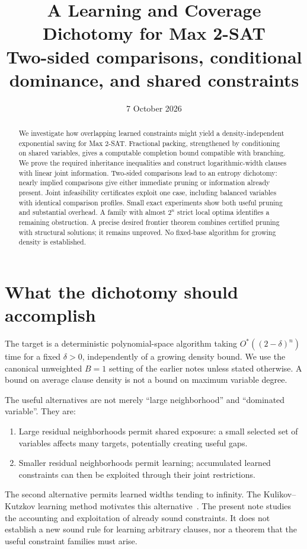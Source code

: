 \documentclass[11pt,a4paper]{article}
\title{A Learning and Coverage Dichotomy for Max 2-SAT\\
\large Two-sided comparisons, conditional dominance, and shared constraints}
\author{}
\date{7 October 2026}
\theoremstyle{definition}
\theoremstyle{remark}
\newcommand{\Ostar}{O^{*}}
\begin{document}
\maketitle

\begin{abstract}
We investigate how overlapping learned constraints might yield a
density-independent exponential saving for Max 2-SAT. Fractional packing,
strengthened by conditioning on shared variables, gives a computable
completion bound compatible with branching. We prove the required
inheritance inequalities and construct logarithmic-width clauses with
linear joint information. Two-sided comparisons lead to an entropy
dichotomy: nearly implied comparisons give either immediate pruning or
information already present. Joint infeasibility certificates exploit one
case, including balanced variables with identical comparison profiles.
Small exact experiments show both useful pruning and substantial overhead.
A family with almost $2^n$ strict local optima identifies a remaining
obstruction. A precise desired frontier theorem combines certified pruning
with structural solutions; it remains unproved. No fixed-base algorithm
for growing density is established.
\end{abstract}

\section{What the dichotomy should accomplish}

The target is a deterministic polynomial-space algorithm taking
$\Ostar((2-\delta)^n)$ time for a fixed $\delta>0$, independently of a
growing density bound. We use the canonical unweighted $B=1$ setting of the
earlier notes unless stated otherwise. A bound on average clause density is
not a bound on maximum variable degree.

The useful alternatives are not merely ``large neighborhood'' and
``dominated variable''. They are:
\begin{enumerate}
\item Large residual neighborhoods permit shared exposure: a small selected
set of variables affects many targets, potentially creating useful gaps.
\item Smaller residual neighborhoods permit learning; accumulated learned
constraints can then be exploited through their joint restrictions.
\end{enumerate}
The second alternative permits learned widths tending to infinity. The
Kulikov--Kutzkov learning method motivates this alternative~\cite{KK}.
The present note studies the accounting and exploitation of already sound
constraints. It does not establish a new sound rule for learning arbitrary
clauses, nor a theorem that the useful constraint families must arise.
\end{document}
